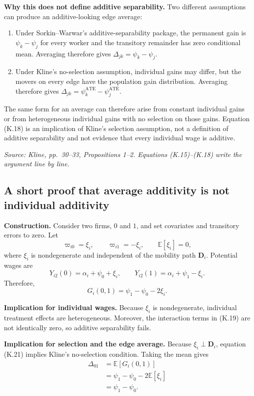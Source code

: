 \documentclass[11pt]{article}
\begin{document}
\textbf{Why this does not define additive separability.}
Two different assumptions can produce an additive-looking edge average:

\begin{enumerate}
\item Under Sorkin--Warwar's additive-separability package, the permanent
gain is \(\psi_k-\psi_j\) for every worker and the transitory remainder has
zero conditional mean.  Averaging therefore gives
\(\Delta_{jk}=\psi_k-\psi_j\).
\item Under Kline's no-selection assumption, individual gains may differ,
but the movers on every edge have the population gain distribution.
Averaging therefore gives
\(\Delta_{jk}
=\psi_k^{\mathrm{ATE}}-\psi_j^{\mathrm{ATE}}\).
\end{enumerate}

The same form for an average can therefore arise from constant individual
gains or from heterogeneous individual gains with no selection on those
gains.  Equation (K.18) is an implication of Kline's selection assumption,
not a definition of additive separability and not evidence that every
individual wage is additive.

\textit{Source: Kline, pp.\ 30--33, Propositions 1--2.  Equations
(K.15)--(K.18) write the argument line by line.}

\subsection{A short proof that average additivity is not individual
additivity}

\textbf{Construction.}
Consider two firms, \(0\) and \(1\), and set covariates and transitory
errors to zero.  Let
\[
\varpi_{i0}=\xi_i,
\qquad
\varpi_{i1}=-\xi_i,
\qquad
\mathbb E[\xi_i]=0,
\tag{K.19}
\]
where \(\xi_i\) is nondegenerate and independent of the mobility path
\(\mathbf D_i\).  Potential wages are
\[
Y_{i2}(0)=\alpha_i+\psi_0+\xi_i,
\qquad
Y_{i2}(1)=\alpha_i+\psi_1-\xi_i.
\tag{K.20}
\]
Therefore,
\[
G_i(0,1)
=
\psi_1-\psi_0-2\xi_i.
\tag{K.21}
\]

\textbf{Implication for individual wages.}
Because \(\xi_i\) is nondegenerate, individual treatment effects are
heterogeneous.  Moreover, the interaction terms in (K.19) are not
identically zero, so additive separability fails.

\textbf{Implication for selection and the edge average.}
Because \(\xi_i\perp\mathbf D_i\), equation (K.21) implies Kline's
no-selection condition.  Taking the mean gives
\[
\begin{aligned}
\Delta_{01}
&=
\mathbb E[G_i(0,1)]\\
&=
\psi_1-\psi_0-2\mathbb E[\xi_i]\\
&=
\psi_1-\psi_0.
\end{aligned}
\tag{K.22}
\]
\end{document}
